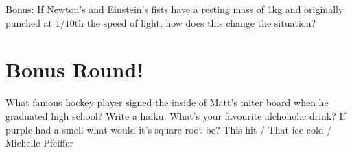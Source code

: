 \documentclass[11pt]{exam}
\begin{document}
\begin{questions}
\question[3] Bonus: If Newton's and Einstein's fists have a resting mass of 1kg and
originally punched at $1/10$th the speed of light, how does this change the situation?
\vfill

\newpage
\section{Bonus Round!}
\setcounter{question}{0}
\question What famous hockey player signed the inside of Matt’s miter board when he graduated high school? 
\vspace{2cm}
\question Write a haiku.
\vspace{5cm}
\question What’s your favourite alchoholic drink? 
\vspace{2cm}
\question If purple had a smell what would it’s square root be? 
\vspace{2cm}
\question This hit / That ice cold / Michelle Pfeiffer
\vspace{2cm}


\end{questions}
\end{document}
